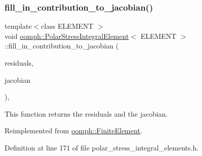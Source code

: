 \subsubsection{\texorpdfstring{fill\+\_\+in\+\_\+contribution\+\_\+to\+\_\+jacobian()}{fill\_in\_contribution\_to\_jacobian()}}
{\footnotesize\ttfamily template$<$class E\+L\+E\+M\+E\+NT $>$ \\
void \hyperlink{classoomph_1_1PolarStressIntegralElement}{oomph\+::\+Polar\+Stress\+Integral\+Element}$<$ E\+L\+E\+M\+E\+NT $>$\+::fill\+\_\+in\+\_\+contribution\+\_\+to\+\_\+jacobian (\begin{DoxyParamCaption}\item[{\hyperlink{classoomph_1_1Vector}{Vector}$<$ double $>$ \&}]{residuals,  }\item[{\hyperlink{classoomph_1_1DenseMatrix}{Dense\+Matrix}$<$ double $>$ \&}]{jacobian }\end{DoxyParamCaption})\hspace{0.3cm}{\ttfamily [inline]}, {\ttfamily [virtual]}}



This function returns the residuals and the jacobian. 



Reimplemented from \hyperlink{classoomph_1_1FiniteElement_a0ae7af222af38a0d53bf283dc85bdfea}{oomph\+::\+Finite\+Element}.



Definition at line 171 of file polar\+\_\+stress\+\_\+integral\+\_\+elements.\+h.

\mbox{\label{classoomph_1_1PolarStressIntegralElement_a2e8896b4e1e698caa3460dd41da55cb8}} 

